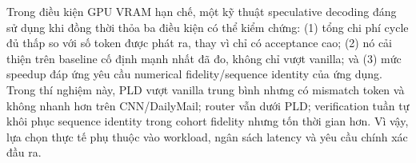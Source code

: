 Trong điều kiện GPU VRAM hạn chế, một kỹ thuật speculative decoding đáng sử dụng khi đồng thời thỏa ba điều kiện có thể kiểm chứng: (1) tổng chi phí cycle đủ thấp so với số token được phát ra, thay vì chỉ có acceptance cao; (2) nó cải thiện trên baseline cố định mạnh nhất đã đo, không chỉ vượt vanilla; và (3) mức speedup đáp ứng yêu cầu numerical fidelity/sequence identity của ứng dụng. Trong thí nghiệm này, PLD vượt vanilla trung bình nhưng có mismatch token và không nhanh hơn trên CNN/DailyMail; router vẫn dưới PLD; verification tuần tự khôi phục sequence identity trong cohort fidelity nhưng tốn thời gian hơn. Vì vậy, lựa chọn thực tế phụ thuộc vào workload, ngân sách latency và yêu cầu chính xác đầu ra.
